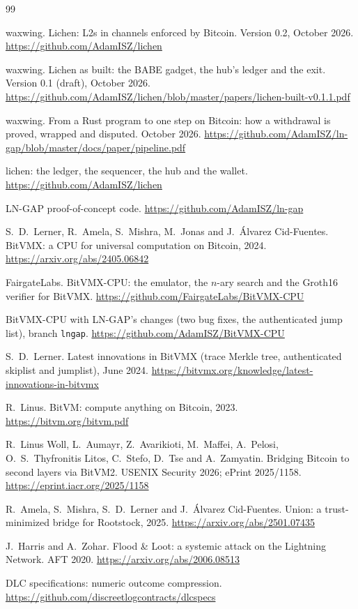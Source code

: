 \documentclass[11pt]{article}
\begin{document}
\begin{thebibliography}{99}

 waxwing. Lichen: L2s in channels enforced by Bitcoin. Version 0.2, October 2026. \url{https://github.com/AdamISZ/lichen}

 waxwing. Lichen as built: the BABE gadget, the hub's ledger and the exit. Version 0.1 (draft), October 2026. \url{https://github.com/AdamISZ/lichen/blob/master/papers/lichen-built-v0.1.1.pdf}

 waxwing. From a Rust program to one step on Bitcoin: how a withdrawal is proved, wrapped and disputed. October 2026. \url{https://github.com/AdamISZ/ln-gap/blob/master/docs/paper/pipeline.pdf}

 lichen: the ledger, the sequencer, the hub and the wallet. \url{https://github.com/AdamISZ/lichen}

 LN-GAP proof-of-concept code. \url{https://github.com/AdamISZ/ln-gap}

 S.~D.~Lerner, R.~Amela, S.~Mishra, M.~Jonas and J.~\'Alvarez Cid-Fuentes. BitVMX: a CPU for universal computation on Bitcoin, 2024. \url{https://arxiv.org/abs/2405.06842}

 FairgateLabs. BitVMX-CPU: the emulator, the $n$-ary search and the Groth16 verifier for BitVMX. \url{https://github.com/FairgateLabs/BitVMX-CPU}

 BitVMX-CPU with LN-GAP's changes (two bug fixes, the authenticated jump list), branch \texttt{lngap}. \url{https://github.com/AdamISZ/BitVMX-CPU}

 S.~D.~Lerner. Latest innovations in BitVMX (trace Merkle tree, authenticated skiplist and jumplist), June 2024. \url{https://bitvmx.org/knowledge/latest-innovations-in-bitvmx}

 R.~Linus. BitVM: compute anything on Bitcoin, 2023. \url{https://bitvm.org/bitvm.pdf}

 R.~Linus Woll, L.~Aumayr, Z.~Avarikioti, M.~Maffei, A.~Pelosi, O.~S.~Thyfronitis Litos, C.~Stefo, D.~Tse and A.~Zamyatin. Bridging Bitcoin to second layers via BitVM2. USENIX Security 2026; ePrint 2025/1158. \url{https://eprint.iacr.org/2025/1158}

 R.~Amela, S.~Mishra, S.~D.~Lerner and J.~\'Alvarez Cid-Fuentes. Union: a trust-minimized bridge for Rootstock, 2025. \url{https://arxiv.org/abs/2501.07435}

 J.~Harris and A.~Zohar. Flood \& Loot: a systemic attack on the Lightning Network. AFT 2020. \url{https://arxiv.org/abs/2006.08513}

 DLC specifications: numeric outcome compression. \url{https://github.com/discreetlogcontracts/dlcspecs}

\end{thebibliography}
\end{document}
